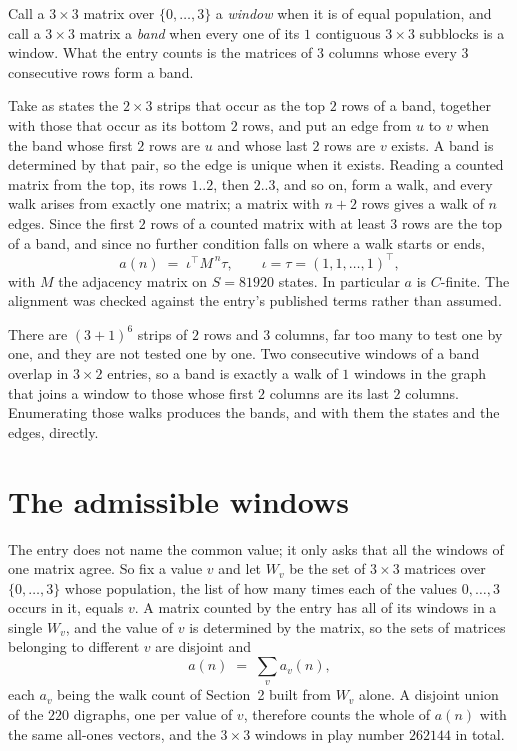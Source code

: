 \documentclass[11pt,a4paper]{article}
\theoremstyle{plain}
\theoremstyle{definition}
\begin{document}
Call a $3\times3$ matrix over $\{0,\dots,3\}$ a \emph{window} when it is of equal population, and
call a $3\times3$ matrix a \emph{band} when every one of its $1$ contiguous
$3\times3$ subblocks is a window. What the entry counts is the matrices of $3$ columns
whose every $3$ consecutive rows form a band.

Take as states the $2\times3$ strips that occur as the top $2$ rows of a band,
together with those that occur as its bottom $2$ rows, and put an edge from $u$ to $v$
when the band whose first $2$ rows are $u$ and whose last $2$ rows are $v$ exists.
A band is determined by that pair, so the edge is unique when it exists. Reading a counted
matrix from the top, its rows $1..2$, then $2..3$, and so on, form a walk, and every
walk arises from exactly one matrix; a matrix with $n+2$ rows gives a walk of $n$ edges.
Since the first $2$ rows of a counted matrix with at least $3$ rows are the top of a
band, and since no further condition falls on where a walk starts or ends,
\[
a(n)\;=\;\iota^{\!\top}M^{\,n}\tau ,\qquad \iota=\tau=(1,1,\dots,1)^{\!\top},
\]
with $M$ the adjacency matrix on $S=81920$ states. In particular $a$ is $C$-finite. The
alignment was checked against the entry's published terms rather than assumed.

There are $(3 + 1)^{6}$ strips of $2$ rows and $3$ columns, far too
many to test one by one, and they are not tested one by one. Two consecutive windows of a band
overlap in $3\times2$ entries, so a band is exactly a walk of $1$ windows in
the graph that joins a window to those whose first $2$ columns are its last $2$
columns. Enumerating those walks produces the bands, and with them the states and the edges,
directly.

\section{The admissible windows}

The entry does not name the common value; it only asks that all the windows of one matrix agree.
So fix a value $v$ and let $W_v$ be the set of $3\times3$ matrices over
$\{0,\dots,3\}$ whose population, the list of how many times each of the values $0,\dots,3$ occurs in it, equals $v$. A matrix counted by the entry has all of
its windows in a single $W_v$, and the value of $v$ is determined by the matrix, so the sets of
matrices belonging to different $v$ are disjoint and
\[
a(n)\;=\;\sum_v a_v(n),
\]
each $a_v$ being the walk count of Section~2 built from $W_v$ alone. A disjoint union of the
$220$ digraphs, one per value of $v$, therefore counts the whole of $a(n)$ with the same
all-ones vectors, and the $3\times3$ windows in play number $262144$ in total.
\end{document}
